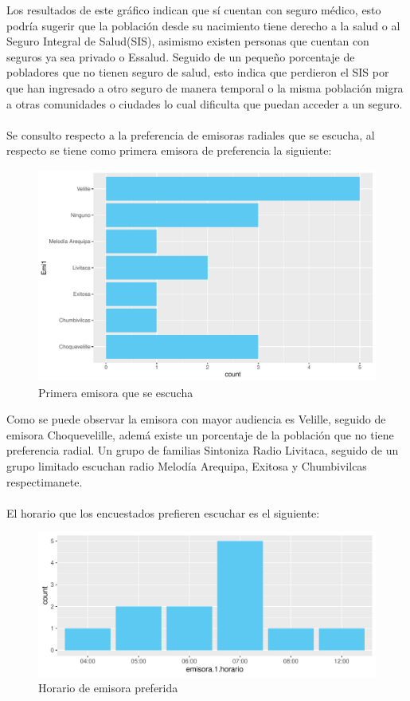 \documentclass[12pt]{article}\usepackage[]{graphicx}\usepackage[]{xcolor}
\makeatletter
\def\maxwidth{ %
  \ifdim\Gin@nat@width>\linewidth
    \linewidth
  \else
    \Gin@nat@width
  \fi
}
\newenvironment{knitrout}{}{} %
\makeatother
\begin{document}
	Los resultados de este gráfico indican que sí cuentan con seguro médico, esto podría sugerir que la población desde su nacimiento tiene derecho a la salud o al Seguro Integral de Salud(SIS), asimismo existen personas que cuentan con seguros ya sea privado o Essalud. Seguido de un pequeño porcentaje de pobladores que no tienen seguro de salud, esto indica que perdieron el SIS por que han ingresado a otro seguro de manera temporal o la misma población migra a otras comunidades o ciudades lo cual dificulta que puedan acceder a un seguro.\\
	\\
	Se consulto respecto a la preferencia de emisoras radiales que se escucha, al respecto se tiene como primera emisora de preferencia la siguiente:
	\begin{figure}[H]
	\centering
\begin{knitrout}
\color{fgcolor}
\includegraphics[width=\maxwidth]{figure/one-1} 
\end{knitrout}
	\caption{Primera emisora que se escucha}
	\end{figure}
	Como se puede observar la emisora con mayor audiencia es Velille, seguido de emisora Choquevelille, ademá existe un porcentaje de la población que no tiene preferencia radial. Un grupo de familias Sintoniza Radio Livitaca, seguido de un grupo limitado escuchan radio Melodía Arequipa, Exitosa y Chumbivilcas respectimanete.\\
	\\
	El horario que los encuestados prefieren escuchar es el siguiente:
	\begin{figure}[H]
	\centering
\begin{knitrout}
\color{fgcolor}
\includegraphics[width=\maxwidth]{figure/two-1} 
\end{knitrout}
	\caption{Horario de emisora preferida}
	\end{figure}
\end{document}
